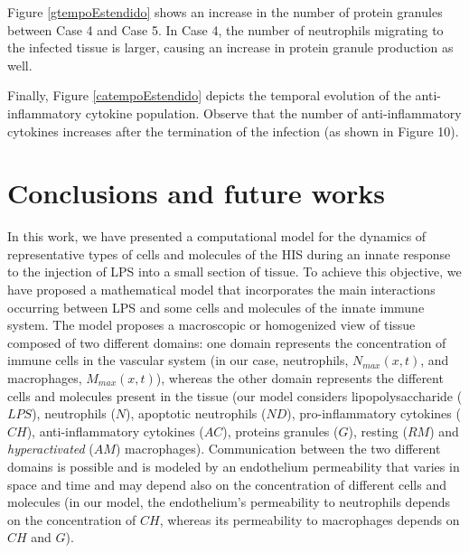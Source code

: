 \documentclass[10pt]{bmc_article}
\newenvironment{bmcformat}{\baselineskip20pt\sloppy\setboolean{publ}{false}}{\baselineskip20pt\sloppy}
\begin{document}
\begin{bmcformat}

Figure \ref{gtempoEstendido} shows an increase in the number of protein granules between Case 4 and Case 5. In Case 4, the number of 
neutrophils migrating to the infected tissue is larger, causing an increase in protein granule production as well. 


Finally, Figure \ref{catempoEstendido} depicts the temporal evolution of the anti-inflammatory cytokine population. Observe that the 
number of anti-inflammatory cytokines increases after the termination of the infection (as shown in Figure 10).


\section*{Conclusions and future works}\label{conclusion}

In this work, we have presented a computational model for the dynamics of representative types of cells and molecules of the HIS 
during an innate response to the injection of LPS into a small section of tissue. To achieve this objective, we have proposed a 
mathematical model that incorporates the main interactions occurring between LPS and some cells and molecules 
of the innate immune system. The model proposes a macroscopic or homogenized view of tissue composed of two different domains: 
one domain represents the concentration of immune cells in the vascular system (in our case, neutrophils, $N_{max}(x,t)$, 
and macrophages, $M_{max}(x,t)$), whereas the other domain represents the different cells and molecules present in the tissue 
(our model considers lipopolysaccharide ($LPS$), neutrophils ($N$), apoptotic neutrophils ($ND$), pro-inflammatory cytokines ($CH$), 
anti-inflammatory cytokines ($AC$), proteins granules ($G$), resting ($RM$) and \textit{hyperactivated} ($AM$) macrophages). 
Communication between the two different domains is possible and is modeled by an endothelium permeability that varies in space and 
time and may depend also on the concentration of different cells and molecules (in our model, the endothelium's permeability to 
neutrophils depends on the concentration of $CH$, whereas its permeability to macrophages depends on $CH$ and $G$).  


\end{bmcformat}
\end{document}
